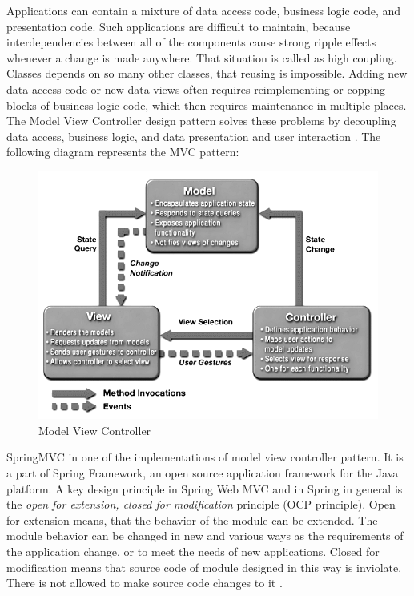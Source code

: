 Applications can contain a mixture of data access code, business logic code, and presentation code. Such applications are difficult to maintain, because interdependencies between all of the components cause strong ripple effects whenever a change is made anywhere. That situation is called as high coupling. Classes depends on so many other classes, that reusing is impossible. Adding new data access code or new data views often requires reimplementing or copping blocks of business logic code, which then requires maintenance in multiple places. The Model View Controller design pattern solves these problems by decoupling data access, business logic, and data presentation and user interaction \cite{SpringMVCSunBlueprints}. The following diagram represents the MVC pattern:

\newpage

\begin{figure}[htp]
\centering
\includegraphics[scale=0.7]{images/chapter4/MVC}
\caption{Model View Controller \cite{SpringMVCSunBlueprints}}
\label{fig:mvc}
\end{figure}

\noindent SpringMVC in one of the implementations of model view controller pattern. It is a part of Spring Framework, an open source application framework for the Java platform. A key design principle in Spring Web MVC and in Spring in general is the \textit{open for extension, closed for modification} principle (OCP principle). Open for extension means, that the behavior of the module can be extended. The module behavior can be changed in new and various ways as the requirements of the application change, or to meet the needs of new applications. Closed for modification means that source code of module designed in this way is inviolate. There is not allowed to make source code changes to it \cite{Mar08}. 

